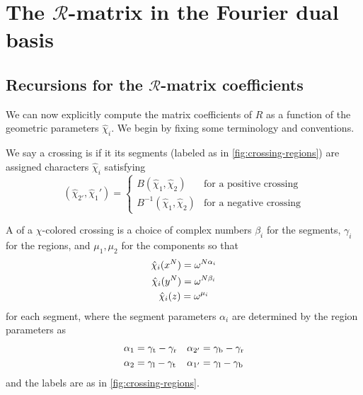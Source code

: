 \documentclass{sl2ams}
\numberwithin{equation}{section}
\newcommand{\R}{\mathcal{R}}
\begin{document}
\section{The \texorpdfstring{\(\R\)}{R}-matrix in the Fourier dual basis}
\label{sec:R-matrix}

\subsection{Recursions for the \texorpdfstring{\(\R\)}{R}-matrix coefficients}
\label{subsec:recurrences}

\begin{marginfigure}
  
  \caption{Labels for the segments and the regions near a crossing.}
  \label{fig:crossing-regions}
\end{marginfigure}

We can now explicitly compute the matrix coefficients of \(R\) as a function of the geometric parameters \(\hat \chi_{i}\).
We begin by fixing some terminology and conventions.

\begin{definition}
  We say a crossing is  if it its segments (labeled as in \cref{fig:crossing-regions}) are assigned characters \(\hat \chi_i\) satisfying
  \begin{equation*}
    (\hat \chi_{2'}, \hat \chi_{1}') =
    \begin{cases}
      B(\hat \chi_{1}, \hat \chi_{2}) & \text{for a positive crossing}
      \\
      B^{-1}(\hat \chi_{1}, \hat \chi_{2}) & \text{for a negative crossing}
    \end{cases}
  \end{equation*}
\end{definition}

\begin{definition}
  A  of a \(\chi\)-colored crossing is a choice of complex numbers \(\beta_{i}\) for the segments, \(\gamma_{i}\) for the regions, and \(\mu_{1}, \mu_{2}\) for the components so that
  \[
    \begin{gathered}
      \hat \chi_{i}(x^{N}) = \omega^{N \alpha_i}
      \\
      \hat \chi_{i}(y^{N}) = \omega^{N \beta_i}
      \\
      \hat \chi_{i}(z) = \omega^{ \mu_i}
    \end{gathered}
  \]
  for each segment, where the segment parameters \(\alpha_{i}\) are determined by the region parameters as
  \begin{align*}
    \alpha_1 &= \gamma_{\mathrm{t}}-\gamma_{\mathrm{r}}
             &
    \alpha_{2'} &= \gamma_{\mathrm{b}} - \gamma_{\mathrm{r}}
    \\
    \alpha_2 &= \gamma_{\mathrm{l}}- \gamma_{\mathrm{t}}
             &
    \alpha_{1'} &= \gamma_{\mathrm{l}} - \gamma_{\mathrm{b}}
  \end{align*}
  and the labels are as in \cref{fig:crossing-regions}.
\end{definition}
\end{document}
